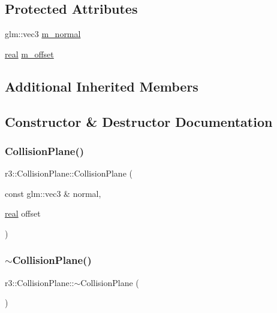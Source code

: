 \subsection*{Protected Attributes}
\begin{DoxyCompactItemize}
\item 
glm\+::vec3 \mbox{\hyperlink{classr3_1_1_collision_plane_ab65e832434d2da433e79c93ac12f4b43}{m\+\_\+normal}}
\item 
\mbox{\hyperlink{namespacer3_ab2016b3e3f743fb735afce242f0dc1eb}{real}} \mbox{\hyperlink{classr3_1_1_collision_plane_a8ae3c28197b05088e405ff9944632f74}{m\+\_\+offset}}
\end{DoxyCompactItemize}
\subsection*{Additional Inherited Members}


\subsection{Constructor \& Destructor Documentation}
\mbox{\label{classr3_1_1_collision_plane_add1bd6bbc252e0d021a6890205a05e56}} 
\subsubsection{\texorpdfstring{Collision\+Plane()}{CollisionPlane()}}
{\footnotesize\ttfamily r3\+::\+Collision\+Plane\+::\+Collision\+Plane (\begin{DoxyParamCaption}\item[{const glm\+::vec3 \&}]{normal,  }\item[{\mbox{\hyperlink{namespacer3_ab2016b3e3f743fb735afce242f0dc1eb}{real}}}]{offset }\end{DoxyParamCaption})}

\mbox{\label{classr3_1_1_collision_plane_a4c83b51c544a5fda9d949baced5cea02}} 
\subsubsection{\texorpdfstring{$\sim$\+Collision\+Plane()}{~CollisionPlane()}}
{\footnotesize\ttfamily r3\+::\+Collision\+Plane\+::$\sim$\+Collision\+Plane (\begin{DoxyParamCaption}{ }\end{DoxyParamCaption})\hspace{0.3cm}{\ttfamily [default]}}



